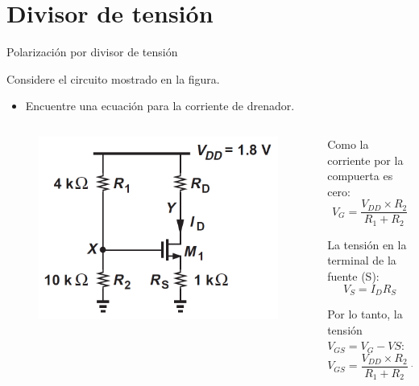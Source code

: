\documentclass[t,aspectratio=169]{beamer}
\begin{document}
\section{Divisor de tensión}
\begin{frame}{Polarización por divisor de tensión}

Considere el circuito mostrado en la figura.

\begin{itemize}
    \item Encuentre una ecuación para la corriente de drenador.
\end{itemize}


\begin{columns}

\begin{column}{0.4\textwidth}

\begin{figure}
\centering
\includegraphics[width=\textwidth]{figuras/mosfet_polarizacion_divisor.png}
\end{figure}

\end{column}

\begin{column}{0.6\textwidth}

Como la corriente por la compuerta es cero:
\[ V_G = \dfrac{V_{DD} \times R_2}{R_1 + R_2} \]

La tensión en la terminal de la fuente (S):
\[ V_S = I_D R_S \]

Por lo tanto, la tensión $V_{GS} = V_G - VS$:
\[ V_{GS} = \dfrac{V_{DD} \times R_2}{R_1 + R_2} - I_D R_S \]

\end{column}

\end{columns}

\end{frame}
\end{document}
